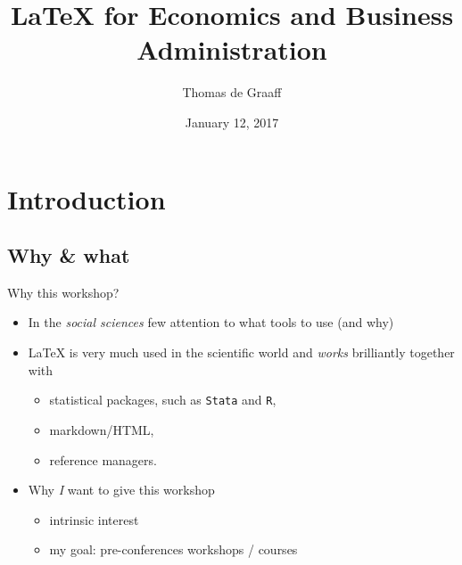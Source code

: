 \documentclass[ignorenonframetext]{beamer}
\title{\LaTeX{} for Economics and Business Administration}
\author{Thomas de Graaff}
\date{January 12, 2017}
\begin{document}
\frame{\titlepage}

\section{Introduction}\label{introduction}

\subsection{Why \& what}\label{introduction-1}

\begin{frame}{Why this workshop?}

\begin{itemize}
\item
  In the \emph{social sciences} few attention to what tools to use (and why)
  \newline
\item
  \LaTeX{} is very much used in the scientific world and \emph{works} brilliantly together with
  \begin{itemize}
  \item statistical packages, such as \texttt{Stata} and \texttt{R},
  \item markdown/HTML,
  \item reference managers.
  \newline
  \end{itemize}
  \item Why \emph{I} want to give this workshop
  \begin{itemize}
	  \item intrinsic interest
	  \item my goal: pre-conferences workshops / courses
  \end{itemize}
\end{itemize}
\end{frame}
\end{document}
